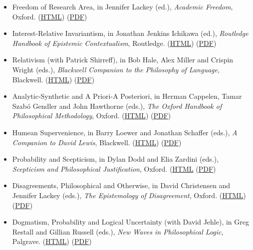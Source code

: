 \documentclass[
  10pt,
  letterpaper,
  DIV=11,
  numbers=noendperiod,
  twoside]{scrartcl}
\providecommand{\tightlist}{%
  \setlength{\itemsep}{0pt}\setlength{\parskip}{0pt}}\usepackage{longtable,booktabs,array}
\begin{document}
\begin{itemize}
\tightlist
\item
  Freedom of Research Area, in Jennifer Lackey (ed.), \emph{Academic
  Freedom}, Oxford.
  (\href{./posts/fora/freedom-of-research-area.html}{HTML})
  (\href{./posts/fora/Freedom\%20of\%20Research\%20Area.pdf}{PDF})
\item
  Interest-Relative Invariantism, in Jonathan Jenkins Ichikawa (ed.),
  \emph{Routledge Handbook of Epistemic Contextualism}, Routledge.
  (\href{./posts/iri/interest-relative-invariantism.html}{HTML})
  (\href{./posts/iri/Interest\%20Relative\%20Invariantism.pdf}{PDF})
\item
  Relativism (with Patrick Shirreff), in Bob Hale, Alex Miller and
  Crispin Wright (eds.), \emph{Blackwell Companion to the Philosophy of
  Language}, Blackwell.
  (\href{./posts/relativism/relativism.html}{HTML})
  (\href{./posts/relativism/Relativism.pdf}{PDF})
\item
  Analytic-Synthetic and A Priori-A Posteriori, in Herman Cappelen,
  Tamar Szabó Gendler and John Hawthorne (eds.), \emph{The Oxford
  Handbook of Philosophical Methodology}, Oxford.
  (\href{./posts/synthetic/analytic-synthetic-and-a-priori-a-posteriori.html}{HTML})
  (\href{./posts/synthetic/Analytic-Synthetic\%20and\%20A\%20Priori-A\%20Posteriori.pdf}{PDF})
\item
  Humean Supervenience, in Barry Loewer and Jonathan Schaffer (eds.),
  \emph{A Companion to David Lewis}, Blackwell.
  (\href{./posts/humsup/humean-supervenience.html}{HTML})
  (\href{./posts/humsup/Humean\%20Supervenience.pdf}{PDF})
\item
  Probability and Scepticism, in Dylan Dodd and Elia Zardini (eds.),
  \emph{Scepticism and Philosophical Justification}, Oxford.
  (\href{./posts/pas/probability-and-scepticism.html}{HTML}
  (\href{./posts/pas/Probability\%20and\%20Scepticism.pdf}{PDF})
\item
  Disagreements, Philosophical and Otherwise, in David Christensen and
  Jennifer Lackey (eds.), \emph{The Epistemology of Disagreement},
  Oxford.
  (\href{./posts/dpao/disagreements-philosophical-and-otherwise.html}{HTML})
  (\href{./posts/dpao/Disagreements,\%20Philosophical\%20and\%20Otherwise.pdf}{PDF})
\item
  Dogmatism, Probability and Logical Uncertainty (with David Jehle), in
  Greg Restall and Gillian Russell (eds.), \emph{New Waves in
  Philosophical Logic}, Palgrave.
  (\href{posts/dplu/dogmatism-probability-and-logical-uncertainty.html}{HTML})
  (\href{./posts/dplu/Dogmatism,\%20Probability\%20and\%20Logical\%20Uncertainty.pdf}{PDF})

\end{itemize}
\end{document}
